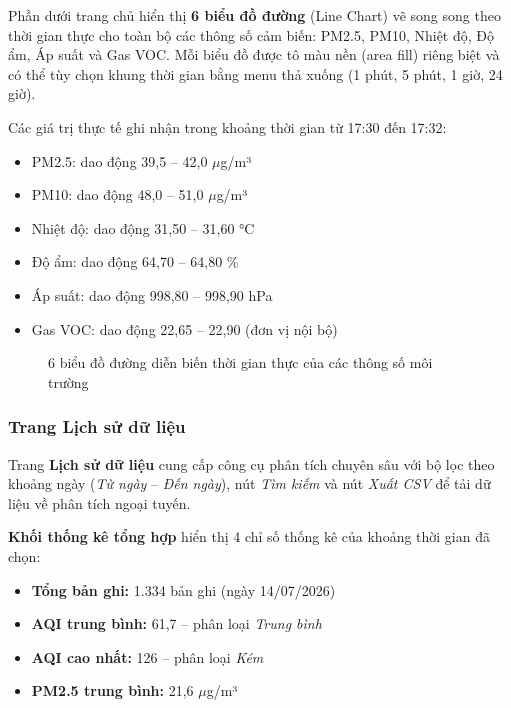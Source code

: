 \documentclass[12pt,a4paper]{article}
\begin{document}
Phần dưới trang chủ hiển thị \textbf{6 biểu đồ đường} (Line Chart) vẽ song song theo thời gian thực cho toàn bộ các thông số cảm biến: PM2.5, PM10, Nhiệt độ, Độ ẩm, Áp suất và Gas VOC. Mỗi biểu đồ được tô màu nền (area fill) riêng biệt và có thể tùy chọn khung thời gian bằng menu thả xuống (1 phút, 5 phút, 1 giờ, 24 giờ).

Các giá trị thực tế ghi nhận trong khoảng thời gian từ 17:30 đến 17:32:
\begin{itemize}
    \item PM2.5: dao động 39,5 -- 42,0 $\mu$g/m³
    \item PM10: dao động 48,0 -- 51,0 $\mu$g/m³
    \item Nhiệt độ: dao động 31,50 -- 31,60 °C
    \item Độ ẩm: dao động 64,70 -- 64,80 \%
    \item Áp suất: dao động 998,80 -- 998,90 hPa
    \item Gas VOC: dao động 22,65 -- 22,90 (đơn vị nội bộ)
\end{itemize}

\begin{figure}[H]
    \centering
    \caption{6 biểu đồ đường diễn biến thời gian thực của các thông số môi trường}
    \label{fig:dashboard_charts}
\end{figure}

\subsubsection{Trang Lịch sử dữ liệu}

Trang \textbf{Lịch sử dữ liệu} cung cấp công cụ phân tích chuyên sâu với bộ lọc theo khoảng ngày (\textit{Từ ngày} -- \textit{Đến ngày}), nút \textit{Tìm kiếm} và nút \textit{Xuất CSV} để tải dữ liệu về phân tích ngoại tuyến.

\textbf{Khối thống kê tổng hợp} hiển thị 4 chỉ số thống kê của khoảng thời gian đã chọn:
\begin{itemize}
    \item \textbf{Tổng bản ghi:} 1.334 bản ghi (ngày 14/07/2026)
    \item \textbf{AQI trung bình:} 61,7 -- phân loại \textit{Trung bình}
    \item \textbf{AQI cao nhất:} 126 -- phân loại \textit{Kém}
    \item \textbf{PM2.5 trung bình:} 21,6 $\mu$g/m³
\end{itemize}
\end{document}
